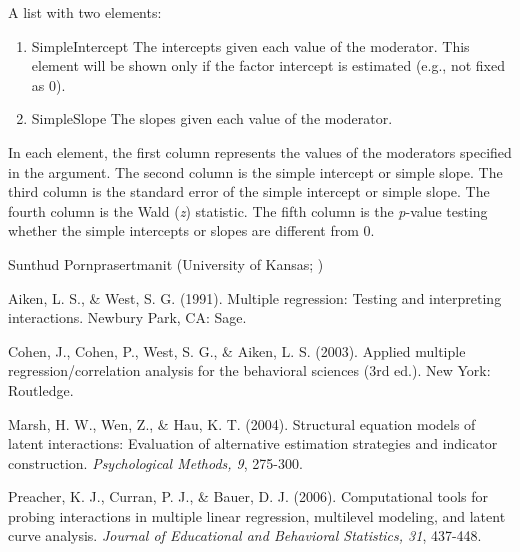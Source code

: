 \documentclass[a4paper]{book}
\begin{document}
\begin{Value}
A list with two elements:
\begin{enumerate}

\item SimpleIntercept The intercepts given each value of the moderator. This element will be shown only if the factor intercept is estimated (e.g., not fixed as 0).
\item SimpleSlope The slopes given each value of the moderator. 

\end{enumerate}

In each element, the first column represents the values of the moderators specified in the  argument. The second column is the simple intercept or simple slope. The third column is the standard error of the simple intercept or simple slope. The fourth column is the Wald (\emph{z}) statistic. The fifth column is the \emph{p}-value testing whether the simple intercepts or slopes are different from 0.
\end{Value}
%
\begin{Author}\relax
Sunthud Pornprasertmanit (University of Kansas; )
\end{Author}
%
\begin{References}\relax
Aiken, L. S., \& West, S. G. (1991). Multiple regression: Testing and interpreting interactions. Newbury Park, CA: Sage.

Cohen, J., Cohen, P., West, S. G., \& Aiken, L. S. (2003). Applied multiple regression/correlation analysis for the behavioral sciences (3rd ed.). New York: Routledge.

Marsh, H. W., Wen, Z., \& Hau, K. T. (2004). Structural equation models of latent interactions: Evaluation of alternative estimation strategies and indicator construction. \emph{Psychological Methods, 9}, 275-300.

Preacher, K. J., Curran, P. J., \& Bauer, D. J. (2006). Computational tools for probing interactions in multiple linear regression, multilevel modeling, and latent curve analysis. \emph{Journal of Educational and Behavioral Statistics, 31}, 437-448.
\end{References}
%
\end{document}
